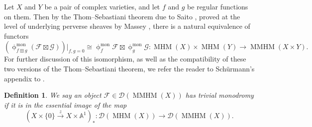 \documentclass[a4paper,10pt]{amsart}
\newtheorem{definition}[theorem]{Definition}
\newcommand{\phim}[1]{\phi^{\mon}_{#1}}
\renewcommand{\phi}{\upphi}
\DeclareMathOperator{\mon}{mon}
\DeclareMathOperator{\MMHM}{MMHM}
\DeclareMathOperator{\MHM}{MHM}
\newcommand{\Dub}{\mathcal{D}}
\begin{document}
Let $X$ and $Y$ be a pair of complex varieties, and let $f$ and $g$ be regular functions on them.  Then by the Thom--Sebastiani theorem due to Saito \cite{Saito10}, proved at the level of underlying perverse sheaves by Massey \cite{Ma01}, there is a natural equivalence of functors 
\begin{equation}
\label{TSiso}
\left(\phim{f\boxplus g}(\mathcal{F}\boxtimes \mathcal{G})\right)|_{f,g=0}\cong \phim{f}\mathcal{F}\boxtimes \phim{g}\mathcal{G}\colon \MHM(X)\times\MHM(Y)\rightarrow \MMHM(X\times Y).
\end{equation}
For further discussion of this isomorphism, as well as the compatibility of these two versions of the Thom--Sebastiani theorem, we refer the reader to Sch\"{u}rmann's appendix to \cite{Br12}.

\begin{definition}\label{trivMonDef}
We say an object $\mathcal{F}\in\Dub(\MMHM(X))$ has \textit{trivial monodromy} if it is in the essential image of the map 
\[
(X\times\{0\}\xrightarrow{z} X\times\mathbb{A}^1)_*\colon \Dub(\MHM(X))\rightarrow\Dub(\MMHM(X)).
\]
\end{definition}
\end{document}
